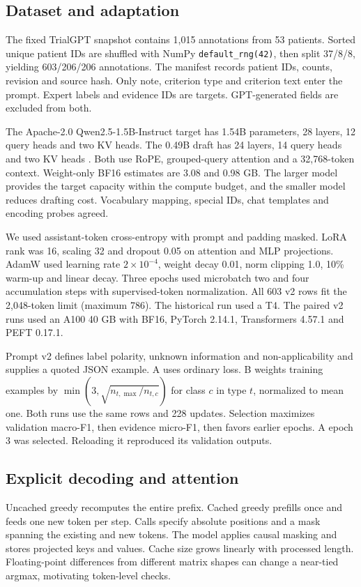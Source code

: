 \documentclass[conference]{IEEEtran}
\begin{document}
\subsection{Dataset and adaptation}
The fixed TrialGPT snapshot contains 1,015 annotations from 53 patients. Sorted unique patient IDs are shuffled with NumPy \texttt{default\_rng(42)}, then split 37/8/8, yielding 603/206/206 annotations. The manifest records patient IDs, counts, revision and source hash. Only note, criterion type and criterion text enter the prompt. Expert labels and evidence IDs are targets. GPT-generated fields are excluded from both.

The Apache-2.0 Qwen2.5-1.5B-Instruct target has 1.54B parameters, 28 layers, 12 query heads and two KV heads. The 0.49B draft has 24 layers, 14 query heads and two KV heads \cite{qwen,models}. Both use RoPE, grouped-query attention and a 32,768-token context. Weight-only BF16 estimates are 3.08 and 0.98 GB. The larger model provides the target capacity within the compute budget, and the smaller model reduces drafting cost. Vocabulary mapping, special IDs, chat templates and encoding probes agreed.

We used assistant-token cross-entropy with prompt and padding masked. LoRA rank was 16, scaling 32 and dropout 0.05 on attention and MLP projections. AdamW used learning rate $2\times10^{-4}$, weight decay 0.01, norm clipping 1.0, 10\% warm-up and linear decay. Three epochs used microbatch two and four accumulation steps with supervised-token normalization. All 603 v2 rows fit the 2,048-token limit (maximum 786). The historical run used a T4. The paired v2 runs used an A100 40 GB with BF16, PyTorch 2.14.1, Transformers 4.57.1 and PEFT 0.17.1.

Prompt v2 defines label polarity, unknown information and non-applicability and supplies a quoted JSON example. A uses ordinary loss. B weights training examples by $\min(3,\sqrt{n_{t,\max}/n_{t,c}})$ for class $c$ in type $t$, normalized to mean one. Both runs use the same rows and 228 updates. Selection maximizes validation macro-F1, then evidence micro-F1, then favors earlier epochs. A epoch 3 was selected. Reloading it reproduced its validation outputs.
\subsection{Explicit decoding and attention}
Uncached greedy recomputes the entire prefix. Cached greedy prefills once and feeds one new token per step. Calls specify absolute positions and a mask spanning the existing and new tokens. The model applies causal masking and stores projected keys and values. Cache size grows linearly with processed length. Floating-point differences from different matrix shapes can change a near-tied argmax, motivating token-level checks.
\end{document}
